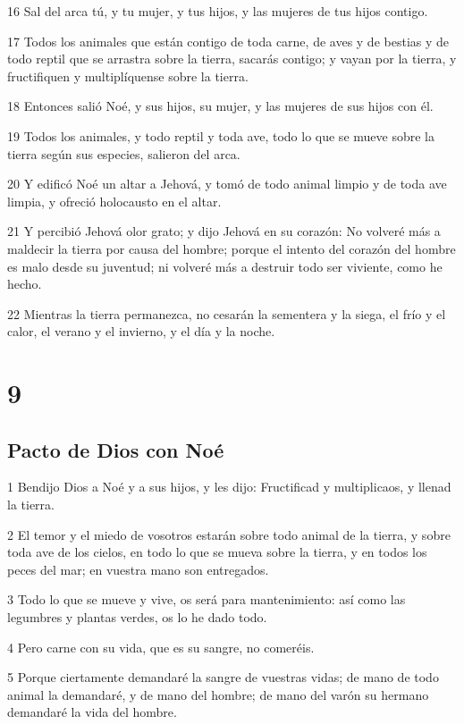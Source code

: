 16 Sal del arca tú, y tu mujer, y tus hijos, y las mujeres de tus hijos contigo.

17 Todos los animales que están contigo de toda carne, de aves y de bestias y de todo reptil que se arrastra sobre la tierra, sacarás contigo; y vayan por la tierra, y fructifiquen y multiplíquense sobre la tierra.

18 Entonces salió Noé, y sus hijos, su mujer, y las mujeres de sus hijos con él.

19 Todos los animales, y todo reptil y toda ave, todo lo que se mueve sobre la tierra según sus especies, salieron del arca.

20 Y edificó Noé un altar a Jehová, y tomó de todo animal limpio y de toda ave limpia, y ofreció holocausto en el altar.

21 Y percibió Jehová olor grato; y dijo Jehová en su corazón: No volveré más a maldecir la tierra por causa del hombre; porque el intento del corazón del hombre es malo desde su juventud; ni volveré más a destruir todo ser viviente, como he hecho.

22 Mientras la tierra permanezca, no cesarán la sementera y la siega, el frío y el calor, el verano y el invierno, y el día y la noche.

\chapter{9}

\section{Pacto de Dios con Noé}

1 Bendijo Dios a Noé y a sus hijos, y les dijo: Fructificad y multiplicaos, y llenad la tierra.

2 El temor y el miedo de vosotros estarán sobre todo animal de la tierra, y sobre toda ave de los cielos, en todo lo que se mueva sobre la tierra, y en todos los peces del mar; en vuestra mano son entregados.

3 Todo lo que se mueve y vive, os será para mantenimiento: así como las legumbres y plantas verdes, os lo he dado todo.

4 Pero carne con su vida, que es su sangre, no comeréis.

5 Porque ciertamente demandaré la sangre de vuestras vidas; de mano de todo animal la demandaré, y de mano del hombre; de mano del varón su hermano demandaré la vida del hombre.

